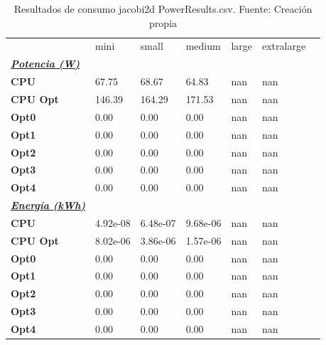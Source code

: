 \begin{table}[H]
    \centering
    \begin{tabular}{lllllll}
    \rowcolor[HTML]{DAE8FC} \ & mini & small & medium & 	large & 	extralarge \\
    \cellcolor[HTML]{DAE8FC} \textbf{\textbf{{\emph{{\underline{{Potencia (W)}}}}}}} &  &  &  & 	 & 	 \\
    \rowcolor[HTML]{EFEFEF} \cellcolor[HTML]{DAE8FC} \textbf{CPU} & 67.75 & 68.67 & 64.83 & 	nan & 	nan \\
    \cellcolor[HTML]{DAE8FC} \textbf{CPU Opt} & 146.39 & 164.29 & 171.53 & 	nan & 	nan \\
    \rowcolor[HTML]{EFEFEF} \cellcolor[HTML]{DAE8FC} \textbf{Opt0} & 0.00 & 0.00 & 0.00 & 	nan & 	nan \\
    \cellcolor[HTML]{DAE8FC} \textbf{Opt1} & 0.00 & 0.00 & 0.00 & 	nan & 	nan \\
    \rowcolor[HTML]{EFEFEF} \cellcolor[HTML]{DAE8FC} \textbf{Opt2} & 0.00 & 0.00 & 0.00 & 	nan & 	nan \\
    \cellcolor[HTML]{DAE8FC} \textbf{Opt3} & 0.00 & 0.00 & 0.00 & 	nan & 	nan \\
    \rowcolor[HTML]{EFEFEF} \cellcolor[HTML]{DAE8FC} \textbf{Opt4} & 0.00 & 0.00 & 0.00 & 	nan & 	nan \\
    \cellcolor[HTML]{DAE8FC} \textbf{\textbf{{\emph{{\underline{{Energía (kWh)}}}}}}} &  &  &  & 	 & 	 \\
    \rowcolor[HTML]{EFEFEF} \cellcolor[HTML]{DAE8FC} \textbf{CPU} & 4.92e-08 & 6.48e-07 & 9.68e-06 & 	nan & 	nan \\
    \cellcolor[HTML]{DAE8FC} \textbf{CPU Opt} & 8.02e-06 & 3.86e-06 & 1.57e-06 & 	nan & 	nan \\
    \rowcolor[HTML]{EFEFEF} \cellcolor[HTML]{DAE8FC} \textbf{Opt0} & 0.00 & 0.00 & 0.00 & 	nan & 	nan \\
    \cellcolor[HTML]{DAE8FC} \textbf{Opt1} & 0.00 & 0.00 & 0.00 & 	nan & 	nan \\
    \rowcolor[HTML]{EFEFEF} \cellcolor[HTML]{DAE8FC} \textbf{Opt2} & 0.00 & 0.00 & 0.00 & 	nan & 	nan \\
    \cellcolor[HTML]{DAE8FC} \textbf{Opt3} & 0.00 & 0.00 & 0.00 & 	nan & 	nan \\
    \rowcolor[HTML]{EFEFEF} \cellcolor[HTML]{DAE8FC} \textbf{Opt4} & 0.00 & 0.00 & 0.00 & 	nan & 	nan \\
    \end{tabular}
    \caption[Resultados de consumo jacobi2d PowerResults.csv]{{Resultados de consumo jacobi2d PowerResults.csv. Fuente: Creación propia}}
    \label{table_global_jacobi2d_PowerResults_data}
\end{table}